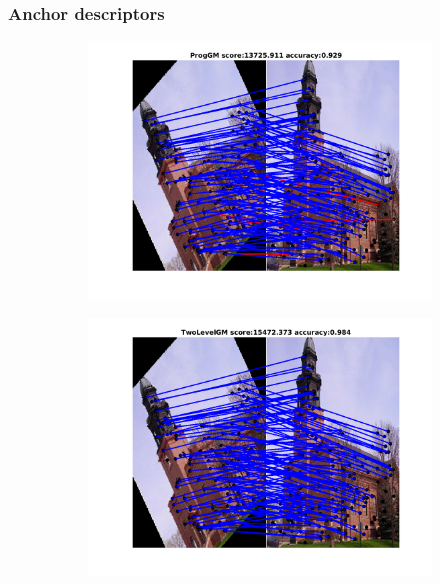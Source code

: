 \subsubsection{Anchor descriptors}
\begin{figure}[h] 
	
	\begin{subfigure}[b]{0.33\textwidth}
		\centering
		\includegraphics[scale=0.25]{"chapter3/fig/ImageTrafo/anchor_descr/using_cpd_afftrafo/fi_1_ProgGM"} 
	\end{subfigure}%
	\begin{subfigure}[b]{0.33\textwidth}
		\centering
		\includegraphics[scale=0.25]{"chapter3/fig/ImageTrafo/anchor_descr/using_cpd_afftrafo/fi_1_TwoLevelGM"} 

\end{subfigure}
\end{figure}
